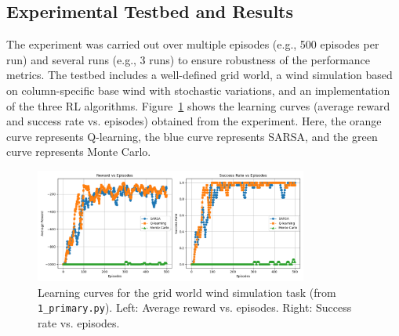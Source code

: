 \documentclass{article}
\begin{document}
\subsection{Experimental Testbed and Results}
The experiment was carried out over multiple episodes (e.g., 500 episodes per run) and several runs (e.g., 3 runs) to ensure robustness of the performance metrics. The testbed includes a well-defined grid world, a wind simulation based on column-specific base wind with stochastic variations, and an implementation of the three RL algorithms. Figure~\ref{fig:figure1} shows the learning curves (average reward and success rate vs. episodes) obtained from the experiment. Here, the orange curve represents Q-learning, the blue curve represents SARSA, and the green curve represents Monte Carlo.

\begin{figure}[H]
    \centering
    \includegraphics[width=0.8\textwidth]{Figure_1.png}
    \caption{Learning curves for the grid world wind simulation task (from \texttt{1\_primary.py}). Left: Average reward vs. episodes. Right: Success rate vs. episodes.}
    \label{fig:figure1}
\end{figure}
\end{document}
